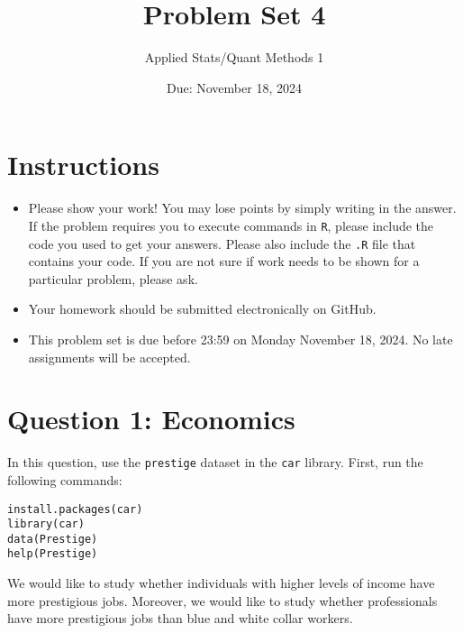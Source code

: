 \documentclass[12pt,letterpaper]{article}
\title{Problem Set 4}
\date{Due: November 18, 2024}
\author{Applied Stats/Quant Methods 1}
\begin{document}
	\maketitle
	\section*{Instructions}
	\begin{itemize}
		\item Please show your work! You may lose points by simply writing in the answer. If the problem requires you to execute commands in \texttt{R}, please include the code you used to get your answers. Please also include the \texttt{.R} file that contains your code. If you are not sure if work needs to be shown for a particular problem, please ask.
		\item Your homework should be submitted electronically on GitHub.
		\item This problem set is due before 23:59 on Monday November 18, 2024. No late assignments will be accepted.
	\end{itemize}



	\vspace{.5cm}
\section*{Question 1: Economics}
\vspace{.25cm}
\noindent 	
In this question, use the \texttt{prestige} dataset in the \texttt{car} library. First, run the following commands:

\begin{verbatim}
install.packages(car)
library(car)
data(Prestige)
help(Prestige)
\end{verbatim} 


\noindent We would like to study whether individuals with higher levels of income have more prestigious jobs. Moreover, we would like to study whether professionals have more prestigious jobs than blue and white collar workers.
\end{document}
